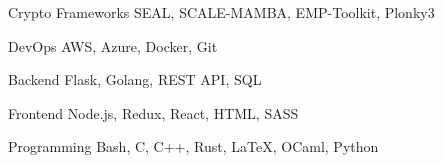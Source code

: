 

\begin{cvskills}

  \cvskill
    {Crypto Frameworks} %
    {SEAL, SCALE-MAMBA, EMP-Toolkit, Plonky3} %

  \cvskill
    {DevOps} %
    {AWS, Azure, Docker, Git} %

  \cvskill
    {Backend} %
    {Flask, Golang, REST API, SQL} %

  \cvskill
    {Frontend} %
    {Node.js, Redux, React, HTML, SASS} %

  \cvskill
    {Programming} %
    {Bash, C, C++, Rust, LaTeX, OCaml, Python} %

\end{cvskills}

